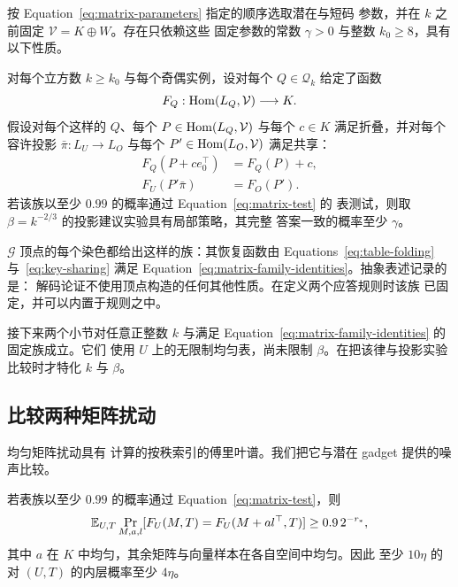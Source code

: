 \begin{proposition}[矩阵解码]
\label{prop:matrix-decoding}
按 Equation~\eqref{eq:matrix-parameters} 指定的顺序选取潜在与短码
参数，并在 $k$ 之前固定 $\mathcal V=K\oplus W$。存在只依赖这些
固定参数的常数 $\gamma>0$ 与整数 $k_0\ge8$，具有以下性质。

对每个立方数 $k\ge k_0$ 与每个奇偶实例，设对每个 $Q\in\mathcal Q_k$
给定了函数
\[
 F_Q:\operatorname{Hom}(L_Q,\mathcal V)\longrightarrow K.
\]
假设对每个这样的 $Q$、每个 $P\in\operatorname{Hom}(L_Q,\mathcal V)$ 与每个
$c\in K$ 满足折叠，并对每个容许投影 $\bar\pi:L_U\to L_O$ 与每个
$P'\in\operatorname{Hom}(L_O,\mathcal V)$ 满足共享：
\begin{equation}
 \begin{aligned}
 F_Q(P+c e_0^\top)&=F_Q(P)+c,\\
 F_U(P'\bar\pi)&=F_O(P').
 \end{aligned}
 \label{eq:matrix-family-identities}
\end{equation}
若该族以至少 $0.99$ 的概率通过 Equation~\eqref{eq:matrix-test} 的
表测试，则取 $\beta=k^{-2/3}$ 的投影建议实验具有局部策略，其完整
答案一致的概率至少 $\gamma$。
\end{proposition}

$\mathcal G$ 顶点的每个染色都给出这样的族：其恢复函数由
Equations~\eqref{eq:table-folding} 与~\eqref{eq:key-sharing} 满足
Equation~\eqref{eq:matrix-family-identities}。抽象表述记录的是：
解码论证不使用顶点构造的任何其他性质。在定义两个应答规则时该族
已固定，并可以内置于规则之中。

接下来两个小节对任意正整数 $k$ 与满足
Equation~\eqref{eq:matrix-family-identities} 的固定族成立。它们
使用 $U$ 上的无限制均匀表，尚未限制 $\beta$。在把该律与投影实验
比较时才特化 $k$ 与 $\beta$。

\subsection{比较两种矩阵扰动}

均匀矩阵扰动具有 \cite[Lemma~2.10 in the 2018 revision]{KMS23}
计算的按秩索引的傅里叶谱。我们把它与潜在 gadget 提供的噪声比较。

\begin{lemma}[谱比较]
\label{lem:matrix-spectral}
若表族以至少 $0.99$ 的概率通过 Equation~\eqref{eq:matrix-test}，则
\begin{equation}
 \mathbb E_{U,T}\Pr_{M,a,l}
   [F_U(M,T)=F_U(M+a l^\top,T)]
 \ge 0.9\,2^{-r_*},
 \label{eq:surrogate-acceptance}
\end{equation}
其中 $a$ 在 $K$ 中均匀，其余矩阵与向量样本在各自空间中均匀。因此
至少 $10\eta$ 的对 $(U,T)$ 的内层概率至少 $4\eta$。
\end{lemma}

